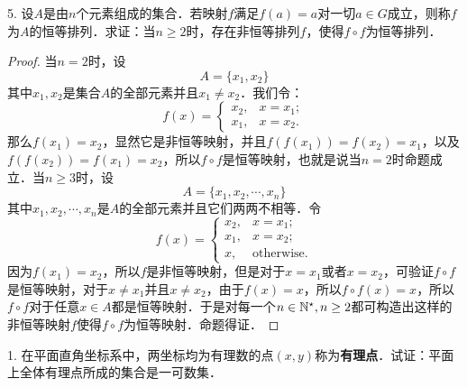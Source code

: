 5. 设$A$是由$n$个元素组成的集合．若映射$f$满足$f(a) = a$对一切$a \in G$成立，则称$f$为$A$的恒等排列．求证：当$n \geq 2$时，存在非恒等排列$f$，使得$f \circ f$为恒等排列．

\begin{proof}
当$n=2$时，设
\begin{equation}
    A = \{ x_1 ,x_2 \}
\end{equation}
其中$x_1, x_2$是集合$A$的全部元素并且$x_1 \neq x_2$．我们令：
\begin{equation}
    f(x) = \begin{cases}
        x_2, & x = x_1; \\
        x_1, & x = x_2. 
    \end{cases}
\end{equation}
那么$f(x_1) = x_2$，显然它是非恒等映射，并且$f(f(x_1)) = f(x_2) = x_1$，以及$f(f(x_2)) = f(x_1) = x_2$，所以$f \circ f$是恒等映射，也就是说当$n=2$时命题成立．当$n \geq 3$时，设
\begin{equation}
    A = \{ x_1, x_2, \cdots , x_n \}
\end{equation}
其中$x_1, x_2, \cdots, x_n$是$A$的全部元素并且它们两两不相等．令
\begin{equation}
    f(x) = \begin{cases}
        x_2, & x = x_1; \\
        x_1, & x = x_2; \\
        x, & \text{otherwise.}
    \end{cases}
\end{equation}
因为$f(x_1) = x_2$，所以$f$是非恒等映射，但是对于$x = x_1$或者$x = x_2$，可验证$f \circ f$是恒等映射，对于$x \neq x_1$并且$x \neq x_2$，由于$f(x) = x$，所以$f \circ f(x) = x$，所以$f \circ f$对于任意$x \in A$都是恒等映射．于是对每一个$n \in \mathbb{N}^\star, n \geq 2$都可构造出这样的非恒等映射$f$使得$f \circ f$为恒等映射．命题得证．
\end{proof}

\exercise

1. 在平面直角坐标系中，两坐标均为有理数的点$(x,y)$称为{\bfseries{有理点}}．试证：平面上全体有理点所成的集合是一可数集．

